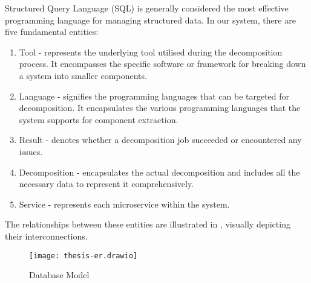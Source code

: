 Structured Query Language (SQL) is generally considered the most effective
programming language for managing structured data. In our system, there are
five fundamental entities:

\begin{enumerate}
  \item Tool - represents the underlying tool utilised during the decomposition
    process. It encompasses the specific software or framework for breaking
    down a system into smaller components.
  \item Language - signifies the programming languages that can be targeted for
    decomposition. It encapsulates the various programming languages that the
    system supports for component extraction.
  \item Result - denotes whether a decomposition job succeeded or encountered
    any issues.
  \item Decomposition - encapsulates the actual decomposition and includes all
    the necessary data to represent it comprehensively.
  \item Service - represents each microservice within the system.
\end{enumerate}

The relationships between these entities are illustrated in
, visually depicting their interconnections.

\begin{figure*}[!htb]
  \caption{Database Model}
  \label{fig:database-model}
  \centering
  \texttt{[image: thesis-er.drawio]}
\end{figure*}
